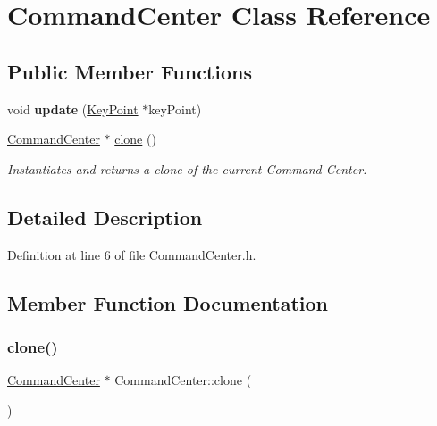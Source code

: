\hypertarget{classCommandCenter}{}\section{Command\+Center Class Reference}
\label{classCommandCenter}
\subsection*{Public Member Functions}
\begin{DoxyCompactItemize}
\item 
\mbox{\label{classCommandCenter_a1aee52be7351e2e2c78c8d239d31cff0}} 
void {\bfseries update} (\hyperlink{classKeyPoint}{Key\+Point} $\ast$key\+Point)
\item 
\hyperlink{classCommandCenter}{Command\+Center} $\ast$ \hyperlink{classCommandCenter_aef666a19f24fd089edd089e4b2cb9542}{clone} ()
\begin{DoxyCompactList}\small\item\em Instantiates and returns a clone of the current Command Center. \end{DoxyCompactList}\end{DoxyCompactItemize}


\subsection{Detailed Description}


Definition at line 6 of file Command\+Center.\+h.



\subsection{Member Function Documentation}
\mbox{\label{classCommandCenter_aef666a19f24fd089edd089e4b2cb9542}} 
\subsubsection{\texorpdfstring{clone()}{clone()}}
{\footnotesize\ttfamily \hyperlink{classCommandCenter}{Command\+Center} $\ast$ Command\+Center\+::clone (\begin{DoxyParamCaption}{ }\end{DoxyParamCaption})}



